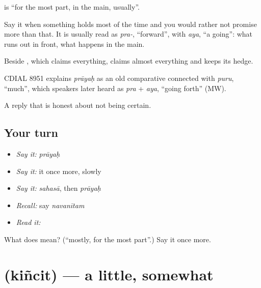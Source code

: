 \textbf{} is \textquotedblleft{}for the most part, in the main, usually\textquotedblright{}.

Say it when something holds most of the time and you would rather not promise more than that. It is usually read as \emph{pra-}, \textquotedblleft{}forward\textquotedblright{}, with \emph{aya}, \textquotedblleft{}a going\textquotedblright{}: what runs out in front, what happens in the main.

Beside , which claims everything, \textbf{} claims almost everything and keeps its hedge.

\begin{cousinweb}
CDIAL 8951 explains \emph{prāyaḥ} as an old comparative connected with \emph{puru}, \textquotedblleft{}much\textquotedblright{}, which speakers later heard as \emph{pra} + \emph{aya}, \textquotedblleft{}going forth\textquotedblright{} (MW).
\end{cousinweb}

\begin{grammarlens}[title={What you've built}]
A reply that is honest about not being certain.
\end{grammarlens}

\subsection*{Your turn}
\begin{itemize}
\raggedright
  \item \emph{Say it:} \emph{prāyaḥ}
  \item \emph{Say it:} it once more, slowly
  \item \emph{Say it:} \emph{sahasā}, then \emph{prāyaḥ}
  \item \emph{Recall:} say \emph{navanītam}
  \item \emph{Read it:} \textbf{}
\end{itemize}

\begin{tcolorbox}[breakable,colback=teal!4,colframe=teal!35!black,title={Before you move on}]
What does  mean? (\textquotedblleft{}mostly, for the most part\textquotedblright{}.) Say it once more.
\end{tcolorbox}
\section[\texorpdfstring{\sk{किञ्चित्} (kiñcit)}{किञ्चित् (kiñcit)}]{ (kiñcit) — a little, somewhat}

